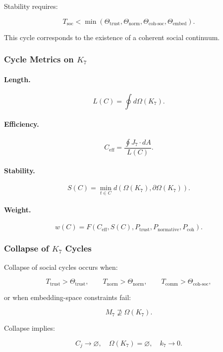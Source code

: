 Stability requires:

\[
  T_{\mathrm{soc}}
  <
  \min(\Theta_{\mathrm{trust}},
       \Theta_{\mathrm{norm}},
       \Theta_{\mathrm{coh\text{-}soc}},
       \Theta_{\mathrm{embed}}).
\]

This cycle corresponds to the existence of a coherent social continuum.

\subsubsection{Cycle Metrics on \texorpdfstring{$K_7$}{K_7}}

\paragraph{Length.}
\[
  L(C)
  = \oint d\Omega(K_7).
\]

\paragraph{Efficiency.}
\[
  C_{\mathrm{eff}}
    =
    \frac{\oint J_7\cdot dA}{L(C)}.
\]

\paragraph{Stability.}
\[
 S(C)
  = \min_{t\in C}
    d(\Omega(K_7), \partial\Omega(K_7)).
\]

\paragraph{Weight.}
\[
 w(C)
 =
 F(C_{\mathrm{eff}},S(C),
   P_{\mathrm{trust}},
   P_{\mathrm{normative}},
   P_{\mathrm{coh}}).
\]

\subsubsection{Collapse of \texorpdfstring{$K_7$}{K_7} Cycles}

Collapse of social cycles occurs when:

\[
 T_{\mathrm{trust}} > \Theta_{\mathrm{trust}},
 \qquad
 T_{\mathrm{norm}} > \Theta_{\mathrm{norm}},
 \qquad
 T_{\mathrm{comm}} > \Theta_{\mathrm{coh\text{-}soc}},
\]

or when embedding-space constraints fail:

\[
 M_7 \not\supseteq \Omega(K_7).
\]

Collapse implies:

\[
 C_j \to \varnothing,\quad
 \Omega(K_7)=\varnothing,\quad
 k_7\to 0.
\]

